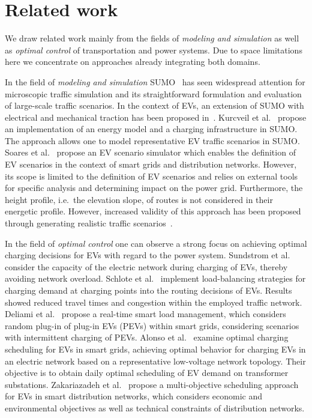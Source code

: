 \section{Related work}
\label{section:retrospection}

We draw related work mainly from the fields of \textit{modeling and simulation} as well as \textit{optimal control} of transportation and power systems. Due to space limitations here we concentrate on approaches already integrating both domains.

In the field of \textit{modeling and simulation} SUMO~\cite{behrisch2011sumo} has seen widespread attention for microscopic traffic simulation and its straightforward formulation and evaluation of large-scale traffic scenarios. In the context of EVs, an extension of SUMO with electrical and mechanical traction has been proposed in~\cite{maia2011electric}. Kurcveil et al.~\cite{kurczveil2014implementation} propose an implementation of an energy model and a charging infrastructure in SUMO. The approach allows one to model representative EV traffic scenarios in SUMO. Soares et al.~\cite{soares2012electric} propose an EV scenario simulator which enables the definition of EV scenarios in the context of smart grids and distribution networks. However, its scope is limited to the definition of EV scenarios and relies on external tools for specific analysis and determining impact on the power grid. Furthermore, the height profile, i.e.\ the elevation slope, of routes is not considered in their energetic profile. However, increased validity of this approach has been proposed through generating realistic traffic scenarios~\cite{soares2014realistic}.

In the field of \textit{optimal control} one can observe a strong focus on achieving optimal charging decisions for EVs with regard to the power system. Sundstrom et al.~\cite{sundstrom2010planning} consider the capacity of the electric network during charging of EVs, thereby avoiding network overload. Schlote et al.~\cite{schlote2012balanced} implement load-balancing strategies for charging demand at charging points into the routing decisions of EVs. Results showed reduced travel times and congestion within the employed traffic network. Deliami et al.~\cite{deilami2011real} propose a real-time smart load management, which considers random plug-in of plug-in EVs (PEVs) within smart grids, considering scenarios with intermittent charging of PEVs. Alonso et al.~\cite{alonso2014optimal} examine optimal charging scheduling for EVs in smart grids, achieving optimal behavior for charging EVs in an electric network based on a representative low-voltage network topology. Their objective is to obtain daily optimal scheduling of EV demand on transformer substations. Zakariazadeh et al.~\cite{zakariazadeh2014multi} propose a multi-objective scheduling approach for EVs in smart distribution networks, which considers economic and environmental objectives as well as technical constraints of distribution networks.

